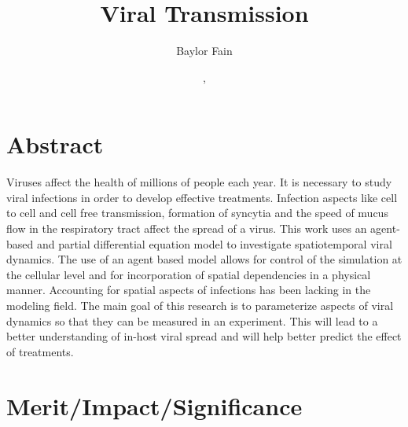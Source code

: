 \documentclass[a4paper]{article}
\title{Viral Transmission}
\author{Baylor Fain}
\date{\monthname[\the\month], \the\year}
\begin{document}
\maketitle

\listoftodos

\section{Abstract}

Viruses affect the health of millions of people each year. It is necessary to study viral infections in order to develop effective treatments. Infection aspects like cell to cell and cell free transmission, formation of syncytia and the speed of mucus flow in the respiratory tract affect the spread of a virus. This work uses an agent-based and partial differential equation model to investigate spatiotemporal viral dynamics. The use of an agent based model allows for control of the simulation at the cellular level and for incorporation of spatial dependencies in a physical manner. Accounting for spatial aspects of infections has been lacking in the modeling field. The main goal of this research is to parameterize aspects of viral dynamics so that they can be measured in an experiment. This will lead to a better understanding of in-host viral spread and will help better predict the effect of treatments.

\section{Merit/Impact/Significance}
\end{document}
